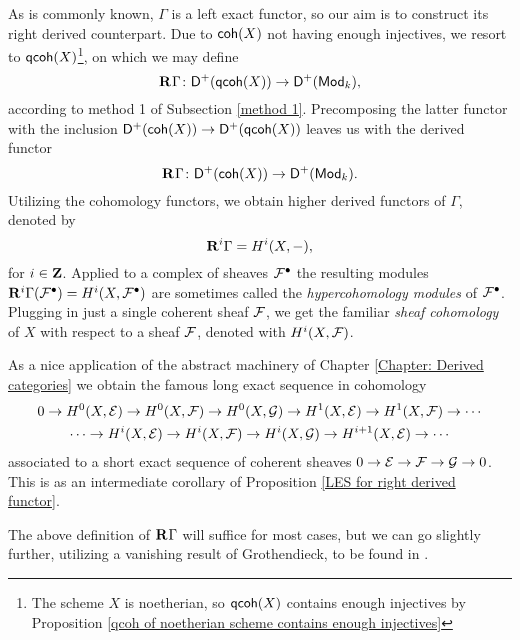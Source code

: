 As is commonly known, $\Gamma$ is a left exact functor, so our aim is to construct its right derived counterpart. Due to $\mathsf{coh}(X)$ not having enough injectives, we resort to $\mathsf{qcoh}(X)$\footnote{The scheme $X$ is noetherian, so $\mathsf{qcoh}(X)$ contains enough injectives by Proposition \ref{qcoh of noetherian scheme contains enough injectives}}, on which we may define 
\[
    \mathbf{R}^{}\Gamma\colon \mathsf{D}^+(\mathsf{qcoh}(X)) \to \mathsf{D}^+(\mathsf{Mod}_{k}),
\]
according to method 1 of Subsection \ref{method 1}. Precomposing the latter functor with the inclusion $\mathsf{D}^+(\mathsf{coh}(X)) \to \mathsf{D}^+(\mathsf{qcoh}(X))$ leaves us with the derived functor
\[
    \mathbf{R}^{}\Gamma \colon \mathsf{D}^+(\mathsf{coh}(X)) \to \mathsf{D}^+(\mathsf{Mod}_{k}).
\]
Utilizing the cohomology functors, we obtain higher derived functors of $\Gamma$, denoted by
\[
    \mathbf{R}^{i}\Gamma = H^{i}(X, -),
\]
for $i \in \mathbf Z$. Applied to a complex of sheaves $\mathcal F^\bullet$ the resulting modules $\mathbf{R}^{i}\Gamma(\mathcal F^\bullet) = H^i(X, \mathcal F^\bullet)$ are sometimes called the \emph{hypercohomology modules} of $\mathcal F^\bullet$.
Plugging in just a single coherent sheaf $\mathcal F$, we get the familiar \emph{sheaf cohomology} of $X$ with respect to a sheaf $\mathcal F$, denoted with $H^{i}(X, \mathcal F)$. 

\begin{example}
    \label{LES in cohomology of SES of coherent sheaves}
    As a nice application of the abstract machinery of Chapter \ref{Chapter: Derived categories} we obtain the famous long exact sequence in cohomology 
    \begin{multline}
        \label{eq: LES in cohomology of SES of coherent sheaves}
        0 \to H^{0}(X, \mathcal E) \to H^{0}(X, \mathcal F) \to H^{0}(X, \mathcal G) \to H^{1}(X, \mathcal E) \to H^{1}(X, \mathcal F) \to \cdots \\
        \cdots \to H^{i}(X, \mathcal E) \to H^{i}(X, \mathcal F) \to H^{i}(X, \mathcal G) \to H^{i+1}(X, \mathcal E) \to \cdots 
    \end{multline}
    associated to a short exact sequence of coherent sheaves $0 \to \mathcal E \to \mathcal F \to \mathcal G \to 0$. This is as an intermediate corollary of Proposition \ref{LES for right derived functor}.
\end{example}

The above definition of $\mathbf{R}^{}\Gamma$ will suffice for most cases, but we can go slightly further, utilizing a vanishing result of Grothendieck, to be found in \cite[\S III, Theorem 2.7]{Hartshorne1977}.


